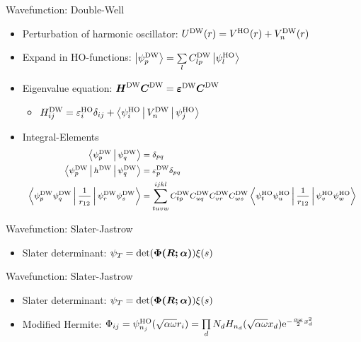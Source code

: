 \documentclass[10pt, t, xcolor=dvipsnames]{beamer}
\begin{document}
{{{{{\begin{frame}[fragile]{Wavefunction: Double-Well}
    \begin{itemize}
        \item Perturbation of harmonic oscillator: $\UDW(r) = \VHO(r) + \VDW_n(r)$
        \item Expand in HO-functions: $\ket{\psiDW_p} = \sumll{l}C^{\text{DW}}_{lp}\ket{\psiHO_l}$
        \item Eigenvalue equation: $\blds{H}^{\text{DW}}\blds{C}^{\text{DW}} =
            \blds{\varepsilon^{\text{DW}}}\blds{C}^{\text{DW}}$
            \begin{itemize}
                \item $H^{\text{DW}}_{ij} = \veps^{\text{HO}}_i\delta_{ij} +
                    \Braket{\psiHO_i|\VDW_n|\psiHO_j}$
            \end{itemize}
        \item Integral-Elements
        \begin{equation*}
            \footnotesize
            \begin{aligned}
                \Braket{\psiDW_p|\psiDW_q} &= \delta_{pq} \\
                \Braket{\psiDW_p|h^{\text{DW}}|\psiDW_q} &=
                \varepsilon^{\text{DW}}_p\delta_{pq} \\
                \Braket{\psiDW_p\psiDW_q|\frac{1}{r_{12}}|\psiDW_r\psiDW_s} &=
                \suml{tuvw}{ijkl} C^{\text{DW}}_{tp}C^{\text{DW}}_{uq}C^{\text{DW}}_{vr}C^{\text{DW}}_{ws}
                \Braket{\psiHO_t\psiHO_u|\frac{1}{r_{12}}|\psiHO_v\psiHO_w}
            \end{aligned}
        \end{equation*}
    \end{itemize}
\end{frame}

\begin{frame}[fragile]{Wavefunction: Slater-Jastrow}
    \begin{itemize}
        \item Slater determinant: $\psi_T =
            \det(\blds{\Phi(\blds{R};\blds{\alpha})})
            \xi(s)$
    \end{itemize}
\end{frame}

\begin{frame}[fragile]{Wavefunction: Slater-Jastrow}
    \begin{itemize}
        \item Slater determinant: $\psi_T =
            \det(\blds{\Phi(\blds{R};\blds{\alpha})}) \xi(s)$
        \item Modified Hermite: $\Phi_{ij} =
            \psi^{\text{HO}}_{n_j}(\sqrt{\alpha\omega}r_i) = \prod\limits_d N_d
            H_{n_d}(\sqrt{\alpha \omega}x_d)\me^{-\frac{\alpha\omega}{2}x^2_d}$
    \end{itemize}
\end{frame}

}}}}}
\end{document}
